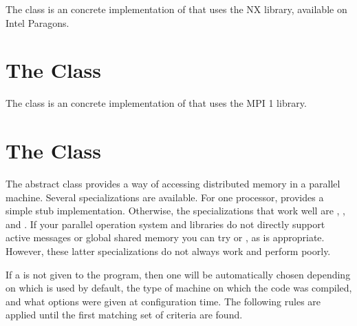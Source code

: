 The  class is an concrete implementation of
 that uses the NX library, available on Intel
Paragons.


\section{The  Class}
\label{MPIMessageGrp}

The  class is an concrete implementation of
 that uses the MPI 1 library.


\section{The  Class}
\label{MemoryGrp}

The  abstract class provides a way of accessing
distributed memory in a parallel machine.  Several specializations are
available.  For one processor,  provides a simple
stub implementation.  Otherwise, the specializations that work well are
, , and
.  If your parallel operation system and libraries
do not directly support active messages or global shared memory you can try
 or , as is appropriate.
However, these latter specializations do not always work and perform
poorly.

If a  is not given to the program, then one will be
automatically chosen depending on which  is used by
default, the type of machine on which the code was compiled, and what
options were given at configuration time.  The following rules are applied
until the first matching set of criteria are found.

